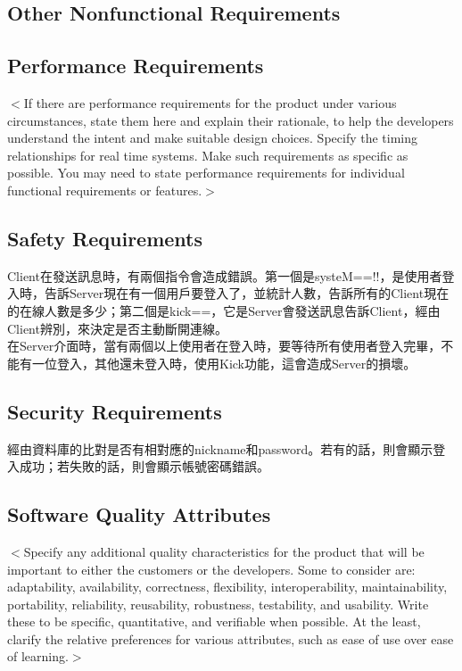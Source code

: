 \documentclass{scrreprt}
\begin{document}
\begin{CJK}{UTF8}{bkai}
\chapter{Other Nonfunctional Requirements}

\section{Performance Requirements}
$<$If there are performance requirements for the product under various 
circumstances, state them here and explain their rationale, to help the 
developers understand the intent and make suitable design choices. Specify the 
timing relationships for real time systems. Make such requirements as specific 
as possible. You may need to state performance requirements for individual 
functional requirements or features.$>$

\section{Safety Requirements}
Client在發送訊息時，有兩個指令會造成錯誤。第一個是systeM==!!，是使用者登入時，告訴Server現在有一個用戶要登入了，並統計人數，告訴所有的Client現在的在線人數是多少；第二個是kick==，它是Server會發送訊息告訴Client，經由Client辨別，來決定是否主動斷開連線。\\
在Server介面時，當有兩個以上使用者在登入時，要等待所有使用者登入完畢，不能有一位登入，其他還未登入時，使用Kick功能，這會造成Server的損壞。\\


\section{Security Requirements}
經由資料庫的比對是否有相對應的nickname和password。若有的話，則會顯示登入成功；若失敗的話，則會顯示帳號密碼錯誤。

\section{Software Quality Attributes}
$<$Specify any additional quality characteristics for the product that will be 
important to either the customers or the developers. Some to consider are: 
adaptability, availability, correctness, flexibility, interoperability, 
maintainability, portability, reliability, reusability, robustness, testability, 
and usability. Write these to be specific, quantitative, and verifiable when 
possible. At the least, clarify the relative preferences for various attributes, 
such as ease of use over ease of learning.$>$


\end{CJK}
\end{document}
